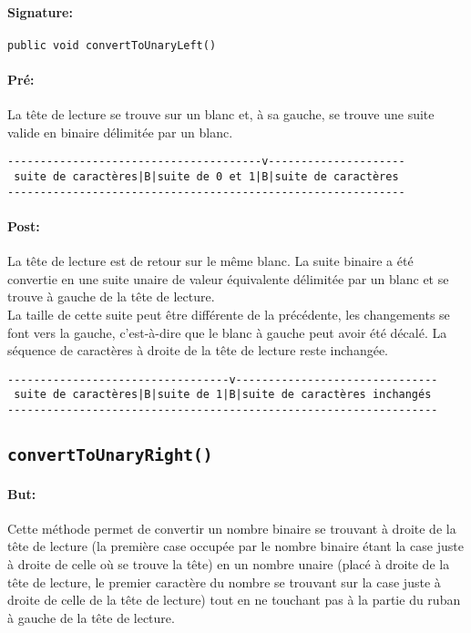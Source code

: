 \documentclass[a4paper,11pt]{article}
\begin{document}
\paragraph{Signature:} \texttt{public void convertToUnaryLeft()}
\paragraph{Pré:} La tête de lecture se trouve sur un blanc et, à sa gauche, se trouve une suite valide en binaire délimitée par un blanc.
\begin{verbatim}
---------------------------------------v---------------------
 suite de caractères|B|suite de 0 et 1|B|suite de caractères
-------------------------------------------------------------
\end{verbatim}
\paragraph{Post:} La tête de lecture est de retour sur le même blanc. La suite binaire a été convertie en une suite unaire de valeur équivalente délimitée par un blanc et se trouve à gauche de la tête de lecture.\\
La taille de cette suite peut être différente de la précédente, les changements se font vers la gauche, c'est-à-dire que le blanc à gauche peut avoir été décalé. La séquence de caractères à droite de la tête de lecture reste inchangée.
\begin{verbatim}
----------------------------------v-------------------------------
 suite de caractères|B|suite de 1|B|suite de caractères inchangés
------------------------------------------------------------------
\end{verbatim}
\subsection{\texttt{convertToUnaryRight()}}
\paragraph{But:} Cette méthode permet de convertir un nombre binaire se trouvant à droite de la tête de lecture (la première case occupée par le nombre binaire étant la case juste à droite de celle où se trouve la tête) en un nombre unaire (placé à droite de la tête de lecture, le premier caractère du nombre se trouvant sur la case juste à droite de celle de la tête de lecture) tout en ne touchant pas à la partie du ruban à gauche de la tête de lecture.
\end{document}
